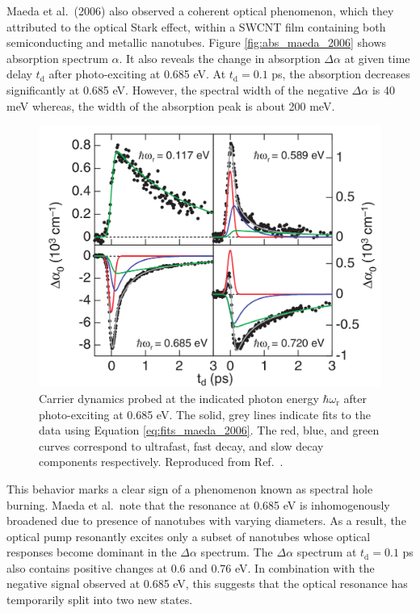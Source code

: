 Maeda et al.\ (2006) also observed a coherent optical phenomenon, which they attributed to the optical Stark effect, within a SWCNT film containing both semiconducting and metallic nanotubes. Figure \ref{fig:abs_maeda_2006} shows absorption spectrum $\alpha$. It also reveals the change in absorption $\Delta \alpha$ at given time delay $t_\text{d}$ after photo-exciting at 0.685 eV. At $t_\text{d} = 0.1$ ps, the absorption decreases significantly at 0.685 eV. However, the spectral width of the negative $\Delta\alpha$ is 40 meV whereas, the width of the absorption peak is about 200 meV.

\begin{figure}[H]
	\centering
	\includegraphics[scale=1.2]{images/chapter_prior_works/dtt_2_maeda_2006}
	\caption{Carrier dynamics probed at the indicated photon energy $\hbar \omega_\text{r}$ after photo-exciting at 0.685 eV. The solid, grey lines indicate fits to the data using Equation \eqref{eq:fits_maeda_2006}. The red, blue, and green curves correspond to ultrafast, fast decay, and slow decay components respectively. Reproduced from Ref.\ \cite{maeda2006gigantic}.}
	\label{fig:dtt_2_maeda_2006}
\end{figure}

This behavior marks a clear sign of a phenomenon known as spectral hole burning. Maeda et al.\ note that the resonance at 0.685 eV is inhomogenously broadened due to presence of nanotubes with varying diameters. As a result, the optical pump resonantly excites only a subset of nanotubes whose optical responses become dominant in the $\Delta \alpha$ spectrum. The $\Delta \alpha$ spectrum at $t_\text{d} = 0.1$ ps also contains positive changes at 0.6 and 0.76 eV. In combination with the negative signal observed at 0.685 eV, this suggests that the optical resonance has temporarily split into two new states.


